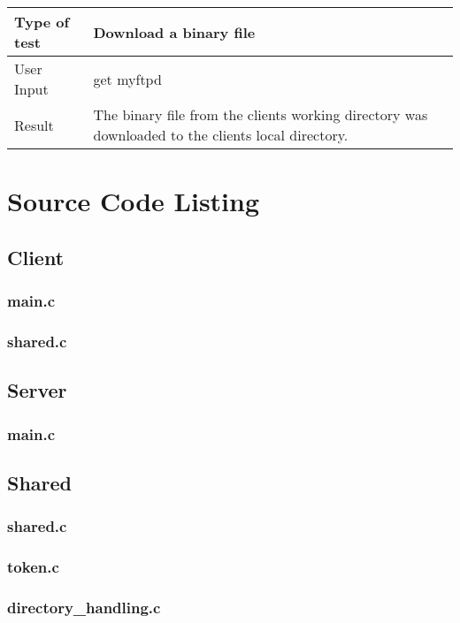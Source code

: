 \documentclass{article}
\begin{document}
    \newline
    \begin{tabulary}{1.0\textwidth}{|L|L|}
    \hline Type of test & Download a binary file\\
    \hline User Input & get myftpd\\
    \hline Result & The binary file from the clients working directory was downloaded to the clients local directory. \\
    \hline
    \end{tabulary}

\newpage
\section{Source Code Listing}
\subsection{Client}
    \subsubsection{main.c}
	
	\subsubsection{shared.c}
	
\subsection{Server}
    \subsubsection{main.c}
	
\subsection{Shared}
    \subsubsection{shared.c}
	
	\subsubsection{token.c}
	
	\subsubsection{directory\_handling.c}
	
\end{document}
